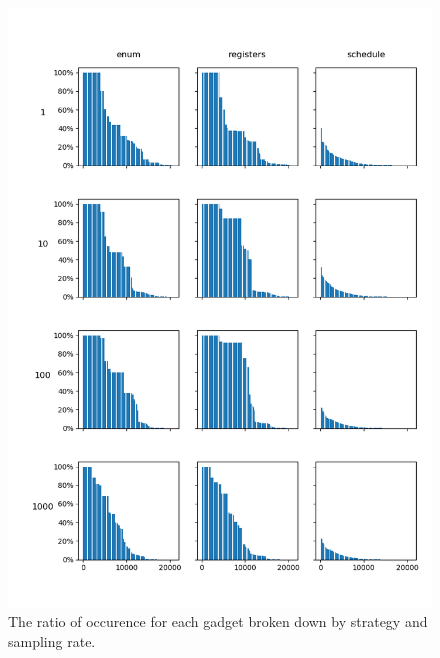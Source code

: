 \begin{figure}[p]
	\centering
	\includegraphics[width=\textwidth]{results/figures/gadgets}
	\caption{The ratio of occurence for each gadget broken down by strategy and sampling rate.}
	\label{fig:gadgets}
\end{figure}
